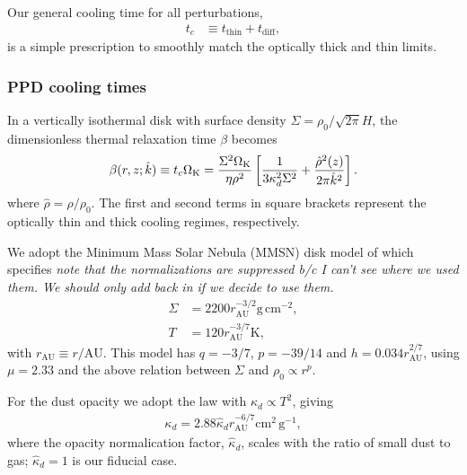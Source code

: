 Our general cooling time for all perturbations,
\begin{align}\label{tc_def}
  t_c &\equiv t_\mathrm{thin} + t _\mathrm{diff},%
\end{align}
is a simple prescription to smoothly match the optically thick and thin limits.

\subsubsection{PPD cooling times}\label{toy_relax}
In a vertically isothermal disk with surface density $\Sigma = \rho_0/\sqrt{2\pi}H$, 
the dimensionless thermal
relaxation time $\beta$ becomes 
\begin{align}\label{real_beta}
  \beta(r,z;\hat{k}) \equiv t_c\Omega_{\rm K} =
  \frac{\Sigma^2\Omega_{\rm K}}{\eta\rho^2}\left[\frac{1}{3\kappa_d^2\Sigma^2} 
    + \frac{\hat{\rho}^2(z)}{2\pi \hat{k}^2}\right].
\end{align}
where $\hat{\rho} = \rho/\rho_0$.  The first and second terms in square brackets represent the optically thin and thick cooling regimes, respectively.

We adopt the Minimum Mass Solar Nebula
(MMSN) disk model of \cite{chiang10} which specifies
\emph{note that the normalizations are suppressed b/c I can't see where we used them.  We should only add back in if we decide to use them.}
\begin{subequations}
\begin{align}
\label{mmsn_sigma}
  \Sigma &= 2200 %
 r_\mathrm{AU}^{-3/2} \mathrm{g}\,\mathrm{cm}^{-2},  \\
 T &= 120%
  r_\mathrm{AU}^{-3/7} \mathrm{K}, \label{mmsn_temp}  
\end{align}\end{subequations}
with $r_\mathrm{AU}\equiv r/\mathrm{AU}$.  This model has $q = -3/7$, $p = -39/14$ and $h  = 0.034 r_\mathrm{AU}^{2/7}$, using $\mu = 2.33$ and the above relation between $\Sigma$ and $\rho_0 \propto r^p$.  

For the dust opacity we adopt the \citet{bell94} law with $\kappa_d \propto T^2$, giving
\begin{align}
 \kappa_d %
    =
   2.88\hat{\kappa}_d r_\mathrm{AU}^{-6/7}\mathrm{cm}^2\,\mathrm{g}^{-1},   
\end{align}
where the opacity normalication factor, $\hat{\kappa}_d$, scales with the ratio of small dust to gas;  $\hat{\kappa}_d = 1$ is our fiducial case.

